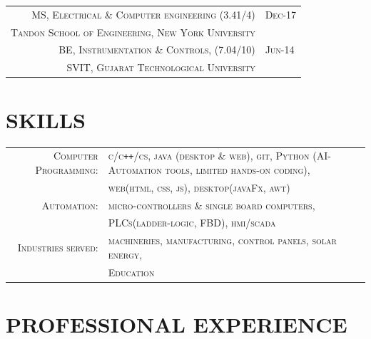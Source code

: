 \documentclass[a4paper]{article}
\begin{document}
\begin{tabular}{rl}
\small{}	\textsc{	MS, Electrical \& Computer engineering \small {(3.41/4)}		} 	& 		\textsc{	Dec-17 	\faGraduationCap		}	\\
 		\textsc{	Tandon School of Engineering, New York University \nyu\;		}	& 												\\
 \small{}	\textsc{	BE, Instrumentation \small{\&} Controls, \small {(7.04/10)}		} 	& 		\textsc{	Jun-14	\faGraduationCap		}	\\
 		\textsc{	SVIT, Gujarat Technological University					}	& 												\\
\end{tabular}

\vspace{-0.7em} %
\section{\hfill \textbf{SKILLS}}
	\begin{tabular}{rl}	\small{}
	 	\small{}\textsc{		Computer Programming:	}	& \textsc{					\small{c/c\texttt{++}/cs}, java (desktop \& web), git, Python (AI-Automation tools, limited hands-on coding),			}	\\
  												& \textsc{					web(html, css, js), desktop(javaFx, awt)							} 	\\
 		\small{}\textsc{		Automation:			}	& \textsc{					micro-controllers \& single board computers,						}	\\
  												& \textsc{					PLCs(ladder-logic, FBD), hmi/scada								} 	\\
 		\small{}\textsc{		Industries served:		}	& \textsc{					machineries, manufacturing, control panels, solar energy,				}	\\
  												& \textsc{					Education													} 	\\
	\end{tabular}






\vspace{-0.7em} %
\section{\hfill \textbf{PROFESSIONAL EXPERIENCE}}
\end{document}
